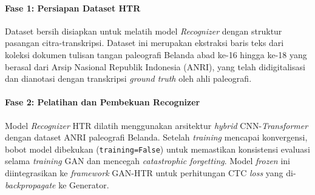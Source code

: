 \documentclass[12pt,a4paper]{article}
\begin{document}
\paragraph{Fase 1: Persiapan Dataset HTR}
Dataset bersih disiapkan untuk melatih model \textit{Recognizer} dengan struktur pasangan citra-transkripsi. Dataset ini merupakan ekstraksi baris teks dari koleksi dokumen tulisan tangan paleografi Belanda abad ke-16 hingga ke-18 yang berasal dari Arsip Nasional Republik Indonesia (ANRI), yang telah didigitalisasi dan dianotasi dengan transkripsi \textit{ground truth} oleh ahli paleografi.

\paragraph{Fase 2: Pelatihan dan Pembekuan Recognizer}
Model \textit{Recognizer} HTR dilatih menggunakan arsitektur \textit{hybrid} CNN-\textit{Transformer} dengan dataset ANRI paleografi Belanda. Setelah \textit{training} mencapai konvergensi, bobot model dibekukan (\texttt{training=False}) untuk memastikan konsistensi evaluasi selama \textit{training} GAN dan mencegah \textit{catastrophic forgetting}. Model \textit{frozen} ini diintegrasikan ke \textit{framework} GAN-HTR untuk perhitungan CTC \textit{loss} yang di-\textit{backpropagate} ke Generator.
\end{document}
